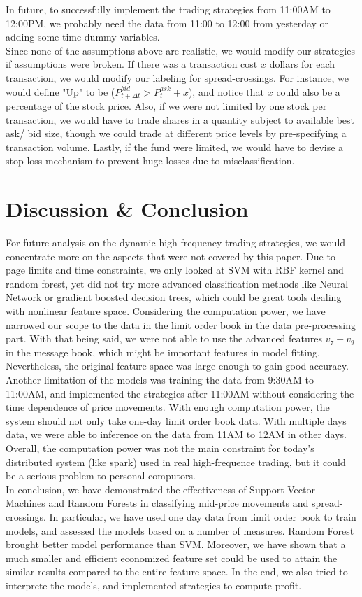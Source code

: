 \documentclass[11pt]{article}
\begin{document}
In future, to successfully implement the trading strategies from 11:00AM to 12:00PM, we probably need the data from 11:00 to 12:00 from yesterday or adding some time dummy variables.\\
Since none of the assumptions above are realistic, we would modify our strategies if assumptions were broken. If there was a transaction cost $x$ dollars for each transaction, we would modify our labeling for spread-crossings. For instance, we would define "Up" to be ($P_{t+\Delta t}^{bid} > P_t^{ask}+x$), and notice that $x$ could also be a percentage of the stock price. Also, if we were not limited by one stock per transaction, we would have to trade shares in a quantity subject to available best ask/ bid size, though we could trade at different price levels by pre-specifying a transaction volume. Lastly, if the fund were limited, we would have to devise a stop-loss mechanism to prevent huge losses due to misclassification.
\section{Discussion \& Conclusion}
For future analysis on the dynamic high-frequency trading strategies, we would concentrate more on the aspects that were not covered by this paper. Due to page limits and time constraints, we only looked at SVM with RBF kernel and random forest, yet did not try more advanced classification methods like Neural Network or gradient boosted decision trees, which could be great tools dealing with nonlinear feature space. Considering the computation power, we have narrowed our scope to the data in the limit order book in the data pre-processing part. With that being said, we were not able to use the advanced features $v_7-v_9$ in the message book, which might be important features in model fitting. Nevertheless, the original feature space was large enough to gain good accuracy.\\
Another limitation of the models was training the data from 9:30AM to 11:00AM, and implemented the strategies after 11:00AM without considering the time dependence of price movements. With enough computation power, the system should not only take one-day limit order book data. With multiple days data, we were able to inference on the data from 11AM to 12AM in other days. Overall, the computation power was not the main constraint for today's distributed system (like spark) used in real high-frequence trading, but it could be a serious problem to personal computors.\\
In conclusion, we have demonstrated the effectiveness of Support Vector Machines and Random Forests in classifying mid-price movements and spread-crossings. In particular, we have used one day data from limit order book to train models, and assessed the models based on a number of measures. Random Forest brought better model performance than SVM. Moreover, we have shown that a much smaller and efficient economized feature set could be used to attain the similar results compared to the entire feature space. In the end, we also tried to interprete the models, and implemented strategies to compute profit.




\end{document}
